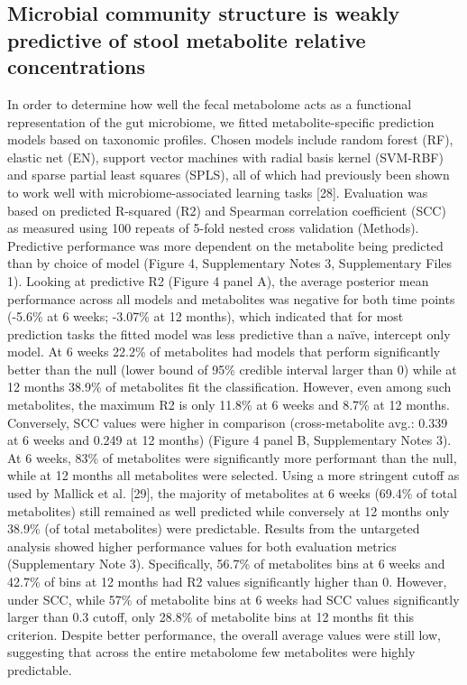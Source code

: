 \subsection{Microbial community structure is weakly predictive of stool metabolite relative concentrations}
In order to determine how well the fecal metabolome acts as a functional representation of the gut microbiome, we fitted metabolite-specific prediction models based on taxonomic profiles. Chosen models include random forest (RF), elastic net (EN), support vector machines with radial basis kernel (SVM-RBF) and sparse partial least squares (SPLS), all of which had previously been shown to work well with microbiome-associated learning tasks [28]. Evaluation was based on predicted R-squared (R2) and Spearman correlation coefficient (SCC) as measured using 100 repeats of 5-fold nested cross validation (Methods). 
Predictive performance was more dependent on the metabolite being predicted than by choice of model (Figure 4, Supplementary Notes 3, Supplementary Files 1). Looking at predictive R2 (Figure 4 panel A), the average posterior mean performance across all models and metabolites was negative for both time points (-5.6\% at 6 weeks; -3.07\% at 12 months), which indicated that for most prediction tasks the fitted model was less predictive than a naïve, intercept only model. At 6 weeks 22.2\% of metabolites had models that perform significantly better than the null (lower bound of 95\% credible interval larger than 0) while at 12 months 38.9\% of metabolites fit the classification. However, even among such metabolites, the maximum R2 is only 11.8\% at 6 weeks and 8.7\% at 12 months. Conversely, SCC values were higher in comparison (cross-metabolite avg.: 0.339 at 6 weeks and 0.249 at 12 months) (Figure 4 panel B, Supplementary Notes 3). At 6 weeks, 83\% of metabolites were significantly more performant than the null, while at 12 months all metabolites were selected. Using a more stringent cutoff as used by Mallick et al. [29], the majority of metabolites at 6 weeks (69.4\% of total metabolites) still remained as well predicted while conversely at 12 months only 38.9\% (of total metabolites) were predictable. 
Results from the untargeted analysis showed higher performance values for both evaluation metrics (Supplementary Note 3). Specifically, 56.7\% of metabolites bins at 6 weeks and 42.7\% of bins at 12 months had R2 values significantly higher than 0. However, under SCC, while 57\% of metabolite bins at 6 weeks had SCC values significantly larger than 0.3 cutoff, only 28.8\% of metabolite bins at 12 months fit this criterion. Despite better performance, the overall average values were still low, suggesting that across the entire metabolome few metabolites were highly predictable.  
